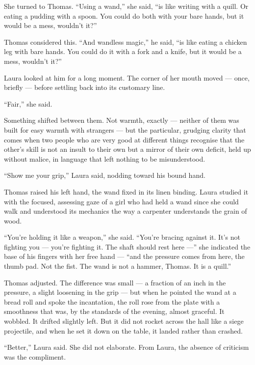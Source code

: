 She turned to Thomas. \enquote{Using a wand,} she said, \enquote{is like writing with a quill. Or eating a pudding with a spoon. You could do both with your bare hands, but it would be a mess, wouldn't it?}
 
Thomas considered this. \enquote{And wandless magic,} he said, \enquote{is like eating a chicken leg with bare hands. You could do it with a fork and a knife, but it would be a mess, wouldn't it?}
 
Laura looked at him for a long moment. The corner of her mouth moved --- once, briefly --- before settling back into its customary line.
 
\enquote{Fair,} she said.
 
Something shifted between them. Not warmth, exactly --- neither of them was built for easy warmth with strangers --- but the particular, grudging clarity that comes when two people who are very good at different things recognise that the other's skill is not an insult to their own but a mirror of their own deficit, held up without malice, in language that left nothing to be misunderstood.
 
\enquote{Show me your grip,} Laura said, nodding toward his bound hand.
 
Thomas raised his left hand, the wand fixed in its linen binding. Laura studied it with the focused, assessing gaze of a girl who had held a wand since she could walk and understood its mechanics the way a carpenter understands the grain of wood.
 
\enquote{You're holding it like a weapon,} she said. \enquote{You're bracing against it. It's not fighting you --- you're fighting it. The shaft should rest here ---} she indicated the base of his fingers with her free hand --- \enquote{and the pressure comes from here, the thumb pad. Not the fist. The wand is not a hammer, Thomas. It is a quill.}
 
Thomas adjusted. The difference was small --- a fraction of an inch in the pressure, a slight loosening in the grip --- but when he pointed the wand at a bread roll and spoke the incantation, the roll rose from the plate with a smoothness that was, by the standards of the evening, almost graceful. It wobbled. It drifted slightly left. But it did not rocket across the hall like a siege projectile, and when he set it down on the table, it landed rather than crashed.
 
\enquote{Better,} Laura said. She did not elaborate. From Laura, the absence of criticism was the compliment.
 

